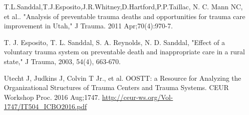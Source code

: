 \documentclass{amia}
\begin{document}
\makeatletter
\renewcommand{\@biblabel}[1]{\hfill #1.}
\makeatother


\begin{thebibliography}{1}
\setlength\itemsep{-0.1em}

T.L.Sanddal,T.J.Esposito,J.R.Whitney,D.Hartford,P.P.Taillac, N. C. Mann NC, et al.. "Analysis of preventable trauma deaths and opportunities for trauma care improvement in Utah," J Trauma. 2011 Apr;70(4):970-7.

T. J. Esposito, T. L. Sanddal, S. A. Reynolds, N. D. Sanddal, "Effect of a voluntary trauma system on preventable death and inappropriate care in a rural state," J Trauma, 2003, 54(4), 663-670.

Utecht J, Judkins J, Colvin T Jr., et al. OOSTT: a Resource for Analyzing the Organizational Structures of Trauma Centers and Trauma Systems. CEUR Workshop Proc. 2016 Aug;1747. \href{http://ceur-ws.org/Vol-1747/IT504_ICBO2016.pdf}{http://ceur-ws.org/Vol-1747/IT504\_ICBO2016.pdf}


\end{thebibliography}
\end{document}
